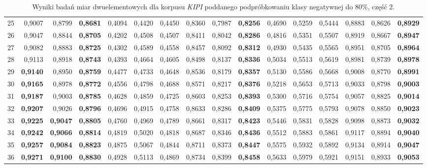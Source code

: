 \begin{table}[htp!]
\begin{adjustwidth}{-2cm}{}
\begin{tabular}{ l | *{15}{| r}}
25	&	0,9007	&	0,8799	&	\textbf{0,8681}	&	0,4094	&	0,4420	&	0,4450	&	0,8360	&	0,7987	&	\textbf{0,8256}	&	0,4690	&	0,5259	&	0,5444	&	0,8883	&	0,8626	&	\textbf{0,8929}	\\
26	&	0,9047	&	0,8844	&	\textbf{0,8705}	&	0,4202	&	0,4508	&	0,4507	&	0,8411	&	0,8042	&	\textbf{0,8286}	&	0,4816	&	0,5351	&	0,5507	&	0,8919	&	0,8667	&	\textbf{0,8947}	\\
27	&	0,9082	&	0,8883	&	\textbf{0,8725}	&	0,4302	&	0,4589	&	0,4558	&	0,8457	&	0,8092	&	\textbf{0,8312}	&	0,4930	&	0,5435	&	0,5565	&	0,8951	&	0,8705	&	\textbf{0,8964}	\\
28	&	0,9113	&	0,8918	&	\textbf{0,8743}	&	0,4393	&	0,4664	&	0,4605	&	0,8498	&	0,8137	&	\textbf{0,8336}	&	0,5034	&	0,5513	&	0,5619	&	0,8981	&	0,8739	&	\textbf{0,8978}	\\
29	&	\textbf{0,9140}	&	0,8950	&	\textbf{0,8759}	&	0,4477	&	0,4733	&	0,4648	&	0,8536	&	0,8179	&	\textbf{0,8357}	&	0,5130	&	0,5586	&	0,5668	&	0,9008	&	0,8770	&	\textbf{0,8991}	\\
30	&	\textbf{0,9165}	&	0,8978	&	\textbf{0,8772}	&	0,4556	&	0,4798	&	0,4688	&	0,8571	&	0,8217	&	\textbf{0,8376}	&	0,5218	&	0,5653	&	0,5713	&	0,9033	&	0,8798	&	\textbf{0,9003}	\\
31	&	\textbf{0,9187}	&	0,9003	&	\textbf{0,8785}	&	0,4628	&	0,4859	&	0,4725	&	0,8603	&	0,8253	&	\textbf{0,8393}	&	0,5300	&	0,5716	&	0,5754	&	0,9057	&	0,8825	&	\textbf{0,9014}	\\
32	&	\textbf{0,9207}	&	0,9026	&	\textbf{0,8796}	&	0,4696	&	0,4915	&	0,4758	&	0,8633	&	0,8286	&	\textbf{0,8409}	&	0,5375	&	0,5775	&	0,5793	&	0,9078	&	0,8850	&	\textbf{0,9023}	\\
33	&	\textbf{0,9225}	&	\textbf{0,9047}	&	\textbf{0,8805}	&	0,4760	&	0,4969	&	0,4789	&	0,8661	&	0,8317	&	\textbf{0,8423}	&	0,5446	&	0,5831	&	0,5828	&	0,9098	&	0,8873	&	\textbf{0,9032}	\\
34	&	\textbf{0,9242}	&	\textbf{0,9066}	&	\textbf{0,8814}	&	0,4819	&	0,5020	&	0,4818	&	0,8687	&	0,8346	&	\textbf{0,8436}	&	0,5512	&	0,5883	&	0,5861	&	0,9117	&	0,8894	&	\textbf{0,9040}	\\
35	&	\textbf{0,9257}	&	\textbf{0,9084}	&	\textbf{0,8823}	&	0,4875	&	0,5067	&	0,4844	&	0,8711	&	0,8373	&	\textbf{0,8447}	&	0,5575	&	0,5932	&	0,5892	&	0,9134	&	0,8914	&	\textbf{0,9047}	\\
36	&	\textbf{0,9271}	&	\textbf{0,9100}	&	\textbf{0,8830}	&	0,4928	&	0,5113	&	0,4869	&	0,8734	&	0,8399	&	\textbf{0,8458}	&	0,5633	&	0,5979	&	0,5921	&	0,9151	&	0,8933	&	\textbf{0,9053}	\\
	\bottomrule
\end{tabular}
 \end{adjustwidth}
\caption[Wyniki badań miar dwuelementowych dla korpusu \emph{KIPI} poddanego podpróbkowaniu klasy negatywnej do 80\%, część 2]{Wyniki badań miar dwuelementowych dla korpusu \emph{KIPI} poddanego podpróbkowaniu klasy negatywnej do 80\%, część 2.}
\label{KIPI_subsampled_20_part_2}
\end{table}

